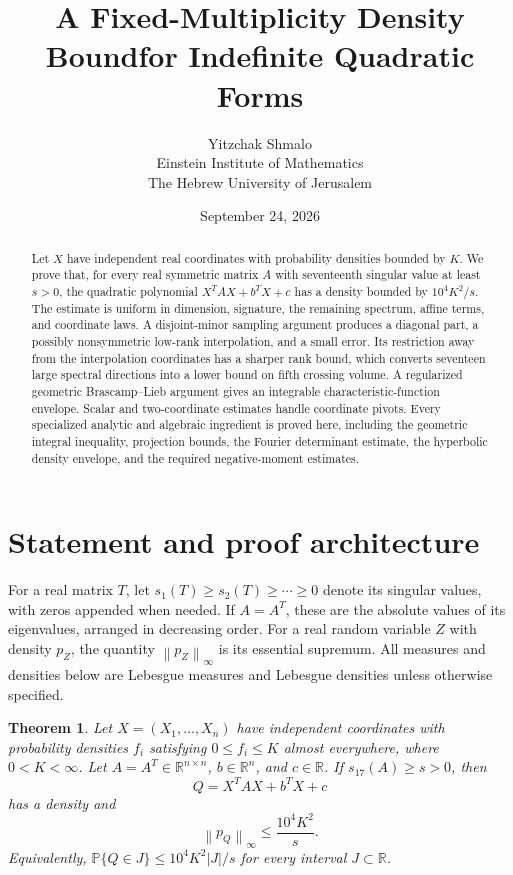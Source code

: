 \documentclass[11pt]{article}
\title{A Fixed-Multiplicity Density Bound\newline for Indefinite Quadratic Forms}
\author{Yitzchak Shmalo\\\small Einstein Institute of Mathematics\\\small The Hebrew University of Jerusalem}
\date{September 24, 2026}
\numberwithin{equation}{section}
\newtheorem{theorem}{Theorem}[section]
\theoremstyle{definition}\newtheorem{definition}[theorem]{Definition}
\theoremstyle{remark}\newtheorem{remark}[theorem]{Remark}
\newcommand{\R}{\mathbb R}\newcommand{\E}{\mathbb E}\newcommand{\PP}{\mathbb P}
\newcommand{\1}{\mathbf 1}\newcommand{\diag}{\operatorname{diag}}
\newcommand{\norm}[1]{\left\lVert#1\right\rVert}\newcommand{\abs}[1]{\left|#1\right|}
\begin{document}
\maketitle
\begin{abstract}
Let $X$ have independent real coordinates with probability densities bounded by $K$. We prove that, for every real symmetric matrix $A$ with seventeenth singular value at least $s>0$, the quadratic polynomial $X^TAX+b^TX+c$ has a density bounded by $10^4K^2/s$. The estimate is uniform in dimension, signature, the remaining spectrum, affine terms, and coordinate laws. A disjoint-minor sampling argument produces a diagonal part, a possibly nonsymmetric low-rank interpolation, and a small error. Its restriction away from the interpolation coordinates has a sharper rank bound, which converts seventeen large spectral directions into a lower bound on fifth crossing volume. A regularized geometric Brascamp--Lieb argument gives an integrable characteristic-function envelope. Scalar and two-coordinate estimates handle coordinate pivots. Every specialized analytic and algebraic ingredient is proved here, including the geometric integral inequality, projection bounds, the Fourier determinant estimate, the hyperbolic density envelope, and the required negative-moment estimates.
\end{abstract}
\setcounter{tocdepth}{1}
\tableofcontents
\clearpage

\section{Statement and proof architecture}
For a real matrix $T$, let $s_1(T)\ge s_2(T)\ge\cdots\ge0$ denote its singular values, with zeros appended when needed. If $A=A^T$, these are the absolute values of its eigenvalues, arranged in decreasing order. For a real random variable $Z$ with density $p_Z$, the quantity $\norm{p_Z}_\infty$ is its essential supremum. All measures and densities below are Lebesgue measures and Lebesgue densities unless otherwise specified.

\begin{theorem}\label{thm:main}
Let $X=(X_1,\ldots,X_n)$ have independent coordinates with probability densities $f_i$ satisfying $0\le f_i\le K$ almost everywhere, where $0<K<\infty$. Let $A=A^T\in\R^{n\times n}$, $b\in\R^n$, and $c\in\R$. If $s_{17}(A)\ge s>0$, then
\[
 Q=X^TAX+b^TX+c
\]
has a density and
\begin{equation}\label{eq:main}
 \norm{p_Q}_\infty\le \frac{10^4K^2}{s}.
\end{equation}
Equivalently, $\PP\{Q\in J\}\le10^4K^2|J|/s$ for every interval $J\subset\R$.
\end{theorem}
\end{document}
